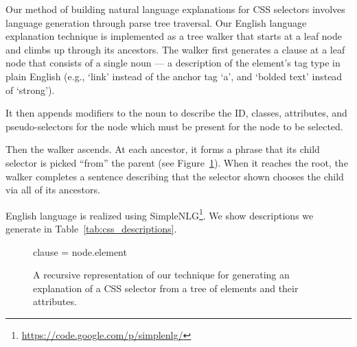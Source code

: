 Our method of building natural language explanations for CSS selectors involves language generation through parse tree traversal.
Our English language explanation technique is implemented as a tree walker that starts at a leaf node and climbs up through its ancestors.
The walker first generates a clause at a leaf node that consists of a single noun --- a description of the element's tag type in plain English (e.g., `link' instead of the anchor tag `a', and `bolded text' instead of `strong').
\begin{changes}
It then appends modifiers to the noun to describe the ID, classes, attributes, and pseudo-selectors for the node which must be present for the node to be selected.

Then the walker ascends.
At each ancestor, it forms a phrase that its child selector is picked ``from'' the parent (see Figure~\ref{alg:css_traversal}).
When it reaches the root, the walker completes a sentence describing that the selector shown chooses the child via all of its ancestors.
\end{changes}
English language is realized using SimpleNLG\footnote{\url{https://code.google.com/p/simplenlg/}}.
We show descriptions we generate in Table~\ref{tab:css_descriptions}. 

\begin{figure}
\begin{algorithmic}
\scriptsize

        clause = node.element
    \Else{}
    \EndIf{}
    \EndIf{}
    \EndIf{}
\EndFunction{}

\end{algorithmic}
\caption{A recursive representation of our technique for generating an explanation of a CSS selector from a tree of elements and their attributes.}
\label{alg:css_traversal}
\end{figure}


